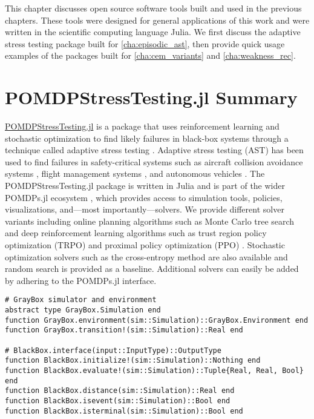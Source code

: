 This chapter discusses open source software tools built and used in the previous chapters.
These tools were designed for general applications of this work and were written in the scientific computing language Julia.
We first discuss the adaptive stress testing package built for \cref{cha:episodic_ast}, then provide quick usage examples of the packages built for \cref{cha:cem_variants} and \cref{cha:weakness_rec}. 

\section{POMDPStressTesting.jl Summary}

\href{https://github.com/sisl/POMDPStressTesting.jl}{POMDPStressTesting.jl} is a package that uses reinforcement learning and stochastic optimization to find likely failures in black-box systems through a technique called adaptive stress testing \cite{ast}.
Adaptive stress testing (AST) has been used to find failures in safety-critical systems such as aircraft collision avoidance systems \cite{ast_acasx}, flight management systems \cite{ast_fms}, and autonomous vehicles \cite{ast_av}.
The POMDPStressTesting.jl package is written in Julia \cite{bezanson2017julia} and is part of the wider POMDPs.jl ecosystem \cite{pomdps_jl}, which provides access to simulation tools, policies, visualizations, and---most importantly---solvers.
We provide different solver variants including online planning algorithms such as Monte Carlo tree search \cite{mcts} and deep reinforcement learning algorithms such as trust region policy optimization (TRPO) \cite{trpo} and proximal policy optimization (PPO) \cite{ppo}.
Stochastic optimization solvers such as the cross-entropy method \cite{cem} are also available and random search is provided as a baseline.
Additional solvers can easily be added by adhering to the POMDPs.jl interface.

\begin{lstlisting}[language=JuliaLocal]
# GrayBox simulator and environment
abstract type GrayBox.Simulation end
function GrayBox.environment(sim::Simulation)::GrayBox.Environment end
function GrayBox.transition!(sim::Simulation)::Real end

# BlackBox.interface(input::InputType)::OutputType
function BlackBox.initialize!(sim::Simulation)::Nothing end
function BlackBox.evaluate!(sim::Simulation)::Tuple{Real, Real, Bool} end
function BlackBox.distance(sim::Simulation)::Real end
function BlackBox.isevent(sim::Simulation)::Bool end
function BlackBox.isterminal(sim::Simulation)::Bool end
\end{lstlisting}

